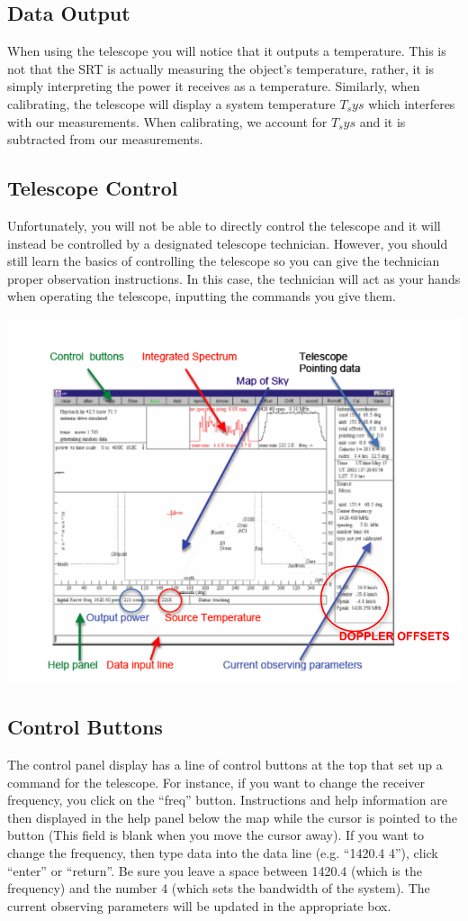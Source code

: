 \subsection{Data Output} 

When using the telescope you will notice that it outputs a temperature. This is not that the SRT is actually measuring the object's temperature, rather, it is simply interpreting the power it receives as a temperature. Similarly, when calibrating, the telescope will display a system temperature $T_sys$ which interferes with our measurements. When calibrating, we account for $T_sys$ and it is subtracted from our measurements. 

\subsection{Telescope Control}
Unfortunately, you will not be able to directly control the telescope and it will instead be controlled by a designated telescope technician. However, you should still learn the basics of controlling the telescope so you can give the technician proper observation instructions. In this case, the technician will act as your hands when operating the telescope, inputting the commands you give them.

\includegraphics[scale = .9]{srt-background-rotation/display_diagram}

\subsection{Control Buttons}
The control panel display has a line of control buttons at the top that set
up a command for the telescope. For instance, if you want to change the receiver
frequency, you click on the “freq” button. Instructions and help information are
then displayed in the help panel below the map while the cursor is pointed to the
button (This field is blank when you move the cursor away). If you want to
change the frequency, then type data into the data line (e.g. “1420.4 4”), click
“enter” or “return”. Be sure you leave a space between 1420.4 (which is the
frequency) and the number 4 (which sets the bandwidth of the system). The
current observing parameters will be updated in the appropriate box.

